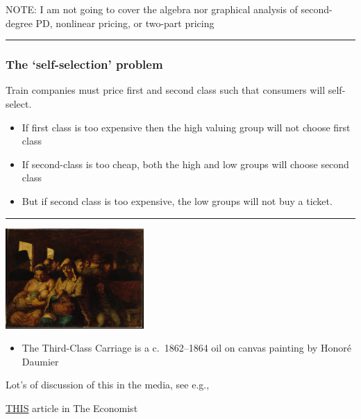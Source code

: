 \documentclass[]{article}
\providecommand{\tightlist}{%
  \setlength{\itemsep}{0pt}\setlength{\parskip}{0pt}}
\begin{document}
NOTE: I am not going to cover the algebra nor graphical analysis of second-degree PD, nonlinear pricing, or two-part pricing

\begin{center}\rule{0.5\linewidth}{\linethickness}\end{center}

\hypertarget{the-self-selection-problem}{%
\subsubsection{The `self-selection' problem}\label{the-self-selection-problem}}

Train companies must price first and second class such that consumers will self-select.

\begin{itemize}
\item
  If first class is too expensive then the high valuing group will not choose first class
\item
  If second-class is too cheap, both the high and low groups will choose second class
\item
  But if second class is too expensive, the low groups will not buy a ticket.
\end{itemize}

\begin{center}\rule{0.5\linewidth}{\linethickness}\end{center}

\includegraphics[height=1.5in]{picsfigs/thirdclasscarriage.jpg}

\begin{itemize}
\tightlist
\item
  The Third-Class Carriage is a c.~1862--1864 oil on canvas painting by Honoré Daumier
\end{itemize}

\bigskip

Lot's of discussion of this in the media, see e.g.,

\href{https://www.1843magazine.com/ideas/the-daily/why-companies-make-their-products-worse}{THIS} article in The Economist
\end{document}
